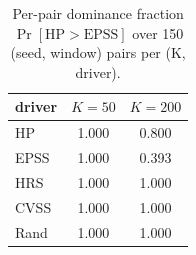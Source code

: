 \begin{table}[!t]
  \caption{Per-pair dominance fraction $\Pr[\mathrm{HP}>\mathrm{EPSS}]$ over 150 (seed, window) pairs per (K, driver).}
  \label{tab:dom}
  \centering
  \small
  \setlength{\tabcolsep}{5pt}
  \begin{tabular}{lcc}
    \toprule
    driver & $K=50$ & $K=200$ \\
    \midrule
    HP & 1.000 & 0.800 \\
    EPSS & 1.000 & 0.393 \\
    HRS & 1.000 & 1.000 \\
    CVSS & 1.000 & 1.000 \\
    Rand & 1.000 & 1.000 \\
    \bottomrule
  \end{tabular}
\end{table}
